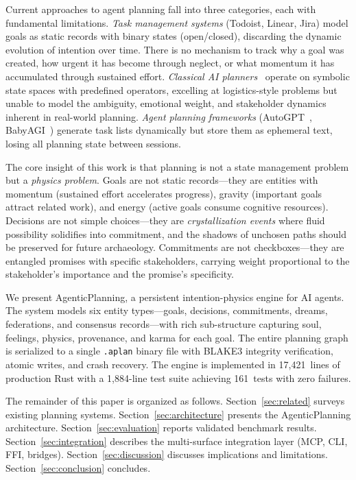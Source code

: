 \documentclass[10pt, twocolumn]{article}
\begin{document}
Current approaches to agent planning fall into three categories, each with fundamental limitations. \emph{Task management systems} (Todoist, Linear, Jira) model goals as static records with binary states (open/closed), discarding the dynamic evolution of intention over time. There is no mechanism to track why a goal was created, how urgent it has become through neglect, or what momentum it has accumulated through sustained effort. \emph{Classical AI planners}~\cite{ghallab2004automated, nau2003shop2} operate on symbolic state spaces with predefined operators, excelling at logistics-style problems but unable to model the ambiguity, emotional weight, and stakeholder dynamics inherent in real-world planning. \emph{Agent planning frameworks} (AutoGPT~\cite{autogpt_2024}, BabyAGI~\cite{babyagi_2024}) generate task lists dynamically but store them as ephemeral text, losing all planning state between sessions.

The core insight of this work is that planning is not a state management problem but a \emph{physics problem}. Goals are not static records---they are entities with momentum (sustained effort accelerates progress), gravity (important goals attract related work), and energy (active goals consume cognitive resources). Decisions are not simple choices---they are \emph{crystallization events} where fluid possibility solidifies into commitment, and the shadows of unchosen paths should be preserved for future archaeology. Commitments are not checkboxes---they are entangled promises with specific stakeholders, carrying weight proportional to the stakeholder's importance and the promise's specificity.

We present AgenticPlanning, a persistent intention-physics engine for AI agents. The system models six entity types---goals, decisions, commitments, dreams, federations, and consensus records---with rich sub-structure capturing soul, feelings, physics, provenance, and karma for each goal. The entire planning graph is serialized to a single \texttt{.aplan} binary file with BLAKE3 integrity verification, atomic writes, and crash recovery. The engine is implemented in 17{,}421~lines of production Rust with a 1{,}884-line test suite achieving 161~tests with zero failures.

The remainder of this paper is organized as follows. Section~\ref{sec:related} surveys existing planning systems. Section~\ref{sec:architecture} presents the AgenticPlanning architecture. Section~\ref{sec:evaluation} reports validated benchmark results. Section~\ref{sec:integration} describes the multi-surface integration layer (MCP, CLI, FFI, bridges). Section~\ref{sec:discussion} discusses implications and limitations. Section~\ref{sec:conclusion} concludes.
\end{document}
